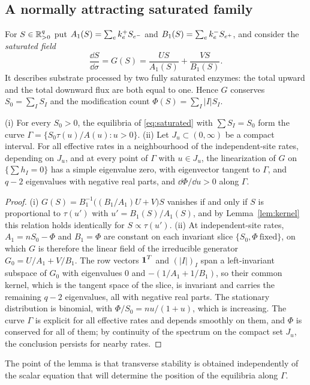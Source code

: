 \subsection{A normally attracting saturated family}
For \(S\in\mathbb R^q_{>0}\) put \(A_1(S)=\sum_ek_e^+S_{e^{-}}\) and \(B_1(S)=\sum_ek_e^-S_{e^{+}}\),
and consider the \emph{saturated field}
\begin{equation}\label{eq:saturated}
 \frac{\dd S}{\dd\sigma}=G(S)=\frac{US}{A_1(S)}+\frac{VS}{B_1(S)} .
\end{equation}
It describes substrate processed by two fully saturated enzymes: the total upward and the
total downward flux are both equal to one. Hence \(G\) conserves \(S_0=\sum_IS_I\) and the
modification count \(\Phi(S)=\sum_I|I|S_I\).
\begin{lemma}\label{lem:normal}
\textup{(i)} For every \(S_0>0\), the equilibria of \eqref{eq:saturated} with \(\sum S_I=S_0\)
form the curve \(\Gamma=\{S_0\tau(u)/A(u):u>0\}\). \textup{(ii)} Let \(J_u\subset(0,\infty)\)
be a compact interval. For all effective rates in a neighbourhood of the independent-site
rates, depending on \(J_u\), and at every point of \(\Gamma\) with \(u\in J_u\), the
linearization of \(G\) on \(\{\sum h_I=0\}\) has a simple eigenvalue zero, with eigenvector
tangent to \(\Gamma\), and \(q-2\) eigenvalues with negative real parts, and
\(\dd\Phi/\dd u>0\) along \(\Gamma\).
\end{lemma}
\begin{proof}
(i) \(G(S)=B_1^{-1}\bigl((B_1/A_1)U+V\bigr)S\) vanishes if and only if \(S\) is proportional to
\(\tau(u')\) with \(u'=B_1(S)/A_1(S)\), and by Lemma~\ref{lem:kernel} this relation holds
identically for \(S\propto\tau(u')\). (ii) At independent-site rates,
\(A_1=nS_0-\Phi\) and \(B_1=\Phi\) are constant on each invariant slice
\(\{S_0,\Phi\ \text{fixed}\}\), on which \(G\) is therefore the linear field of the irreducible
generator \(G_0=U/A_1+V/B_1\). The row vectors \(\boldsymbol 1^T\) and \((|I|)_I\) span a left-invariant
subspace of \(G_0\) with eigenvalues \(0\) and \(-(1/A_1+1/B_1)\), so their common kernel,
which is the tangent space of the slice, is invariant and carries the remaining \(q-2\)
eigenvalues, all with negative real parts. The stationary distribution is binomial, with
\(\Phi/S_0=nu/(1+u)\), which is increasing. The curve \(\Gamma\) is explicit for all effective
rates and depends smoothly on them, and \(\Phi\) is conserved for all of them; by continuity
of the spectrum on the compact set \(J_u\), the conclusion persists for nearby rates.
\end{proof}
The point of the lemma is that transverse stability is obtained independently of the scalar
equation that will determine the position of the equilibria along \(\Gamma\).

